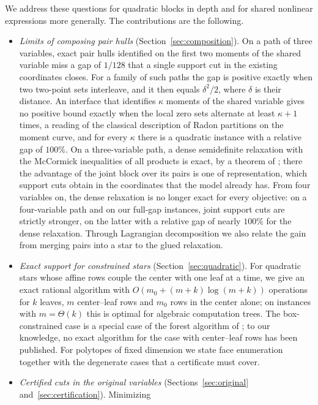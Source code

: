 We address these questions for quadratic blocks in depth and for shared
nonlinear expressions more generally. The contributions are the following.

\begin{itemize}
\item \emph{Limits of composing pair hulls} (Section~\ref{sec:composition}). On
a path of three variables, exact pair hulls identified on the first two
moments of the shared variable miss a gap of $1/128$ that a single support
cut in the existing coordinates closes. For a family of such paths the gap is
positive exactly when two two-point sets interleave, and it then equals
$\delta^2/2$, where $\delta$ is their distance. An interface that identifies
$\kappa$ moments of the shared variable gives no positive bound exactly
when the local zero sets alternate at least $\kappa+1$ times, a reading of the
classical description of Radon partitions on the moment curve, and for every
$\kappa$ there is a quadratic instance with a relative gap of $100\%$. On a
three-variable path, a dense semidefinite relaxation with the McCormick
inequalities of all products is exact, by a theorem of
\citet{BurerNatarajanWillemsen2025}; there the advantage of the joint block
over its pairs is one of representation, which support cuts obtain in the
coordinates that the model already has. From four variables on, the dense
relaxation is no longer exact for every objective: on a four-variable path and
on our full-gap instances, joint support cuts are strictly stronger, on the
latter with a relative gap of nearly $100\%$ for the dense relaxation.
Through Lagrangian decomposition we also relate the gain from merging pairs
into a star to the glued relaxation.
\item \emph{Exact support for constrained stars} (Section~\ref{sec:quadratic}).
For quadratic stars whose affine rows couple the center with one leaf at a
time, we give an exact rational algorithm with $O(m_0+(m+k)\log(m+k))$
operations for $k$ leaves, $m$ center--leaf rows and $m_0$ rows in the center
alone; on instances with $m=\Theta(k)$ this is optimal for algebraic
computation trees. The box-constrained case is a special case of the forest
algorithm of \citet{DelPiaKhajavirad2026}; to our knowledge, no exact
algorithm for the case with center--leaf rows has been published. For
polytopes of fixed dimension we state face enumeration together with the
degenerate cases that a certificate must cover.
\item \emph{Certified cuts in the original variables}
(Sections~\ref{sec:original} and~\ref{sec:certification}). Minimizing

\end{itemize}

